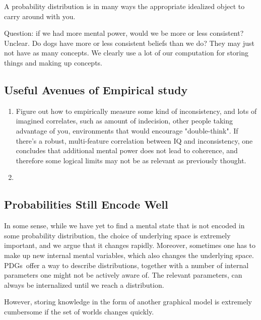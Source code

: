 \documentclass{article}
\newcommand{\MN}{PDG}
\newcommand{\MNs}{\MN s}
\numberwithin{equation}{section}
\begin{document}
	
	
	A probability distribution is in many ways the appropriate idealized object to carry around with you.
	
	Question: if we had more mental power, would we be more or less consistent? Unclear. Do dogs have more or less consistent beliefs than we do? They may just not have as many concepts. We clearly use a lot of our computation for storing things and making up concepts.
	
	

	
	\begin{vfull}
	\subsection{Useful Avenues of Empirical study}
	
	\begin{enumerate}
		\item Figure out how to empirically measure some kind of inconsistency, and lots of imagined correlates, such as amount of indecision, other people taking advantage of you, environments that would encourage "double-think". If there's a robust, multi-feature correlation between IQ and inconsistency, one concludes that additional mental power does not lead to coherence, and therefore some logical limits may not be as relevant as previously thought.
		\item 
	\end{enumerate}
	\end{vfull}
	
	

	\subsection{Probabilities Still Encode Well}	
	In some sense, while we have yet to find a mental state that is not encoded in some probability distribution, the choice of underlying space is extremely important, and we argue that it changes rapidly. Moreover, sometimes one has to make up new internal mental variables, which also changes the underlying space. \MNs\ offer a way to describe distributions, together with a number of internal parameters one might not be actively aware of. The relevant parameters, can always be internalized  until we reach a distribution. 
	
	However, storing knowledge in the form of another graphical model is extremely cumbersome if the set of worlds changes quickly.	
\end{document}
